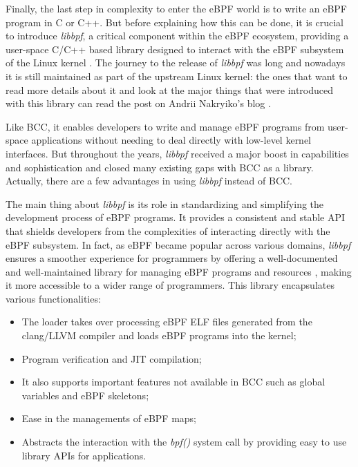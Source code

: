 Finally, the last step in complexity to enter the eBPF world is to write an eBPF program in C or C++.
But before explaining how this can be done, it is crucial to introduce \textit{libbpf},
a critical component within the eBPF ecosystem, providing a user-space C/C++ based library designed to interact with the eBPF subsystem of the Linux kernel \cite{libbpfRepo}. 
The journey to the release of \textit{libbpf} was long and nowadays it is still maintained as part of the upstream Linux kernel: the ones that want to read more details about it and look at the major things that were introduced with this library can read the post on Andrii Nakryiko's blog \cite{libbpfJourney}.

Like BCC, it enables developers to write and manage eBPF programs from user-space applications without needing to deal directly with low-level kernel interfaces.
But throughout the years, \textit{libbpf} received a major boost in capabilities and sophistication and closed many existing gaps with BCC as a library.
Actually, there are a few advantages in using \textit{libbpf} instead of BCC.

The main thing about \textit{libbpf} is its role in standardizing and simplifying the development process of eBPF programs. 
It provides a consistent and stable API that shields developers from the complexities of interacting directly with the eBPF subsystem. 
In fact, as eBPF became popular across various domains, \textit{libbpf} ensures a smoother experience for programmers by offering a well-documented and well-maintained library for managing eBPF programs and resources \cite{libbpfDocumentation}, making it more accessible to a wider range of programmers.
This library encapsulates various functionalities:

\begin{itemize}
	\item The loader takes over processing eBPF ELF files generated from the 
		clang/LLVM compiler and loads eBPF programs into the kernel;
	\item Program verification and JIT compilation;
	\item It also supports important features not available in BCC such as global 
		variables and eBPF skeletons;
	\item Ease in the managements of eBPF maps;
	\item Abstracts the interaction with the \textit{bpf()} system call by providing 
		easy to use library APIs for applications.
\end{itemize}

